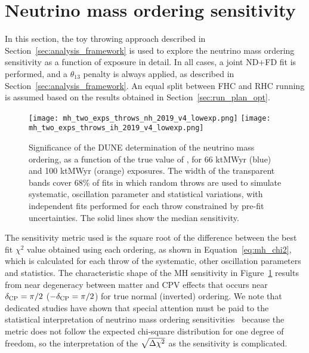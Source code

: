 \section{Neutrino mass ordering sensitivity}
\label{sec:mh_sens}

In this section, the toy throwing approach described in Section~\ref{sec:analysis_framework} is used to explore the neutrino mass ordering sensitivity as a function of exposure in detail. In all cases, a joint ND+FD fit is performed, and a $\theta_{13}$ penalty is always applied, as described in Section~\ref{sec:analysis_framework}. An equal split between FHC and RHC running is assumed based on the results obtained in Section~\ref{sec:run_plan_opt}.

\begin{figure}[htbp]
  \centering
  \texttt{[image: mh\_two\_exps\_throws\_nh\_2019\_v4\_lowexp.png]}
  \texttt{[image: mh\_two\_exps\_throws\_ih\_2019\_v4\_lowexp.png]}
  \caption{Significance of the DUNE determination of the neutrino mass ordering, as a function of the true value of \deltacp, for 66 ktMWyr (blue) and 100 ktMWyr (orange) exposures. The width of the transparent bands cover 68\% of fits in which random throws are used to simulate systematic, oscillation parameter and statistical variations, with independent fits performed for each throw constrained by pre-fit uncertainties. The solid lines show the median sensitivity.}
  \label{fig:mh_bands}
\end{figure}
The sensitivity metric used is the square root of the difference between the best fit $\chi^{2}$ value obtained using each ordering, as shown in Equation~\ref{eq:mh_chi2}, which is calculated for each throw of the systematic, other oscillation parameters and statistics. The characteristic shape of the MH sensitivity in Figure~\ref{fig:mh_bands} results from near degeneracy between matter and CPV effects that occurs near $\delta_{\rm CP}=\pi/2$ ($-\delta_{\rm CP}=\pi/2$) for true normal (inverted) ordering. We note that dedicated studies have shown that special attention must be paid to the statistical interpretation of neutrino mass ordering sensitivities~\cite{Ciuffoli:2013rza,Qian:2012zn,Blennow:2013oma} because the \dchisq metric does not follow the expected chi-square distribution for one degree of freedom, so the interpretation of the $\sqrt{\Delta\chi^{2}}$ as the sensitivity is complicated.


